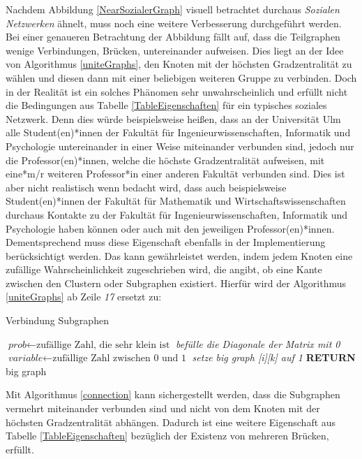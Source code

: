 \newpage
Nachdem Abbildung \ref{NearSozialerGraph} visuell betrachtet durchaus \textit{Sozialen Netzwerken} ähnelt, muss noch eine weitere Verbesserung durchgeführt werden. Bei einer genaueren Betrachtung der Abbildung fällt auf, dass die Teilgraphen wenige Verbindungen, Brücken, untereinander aufweisen. Dies liegt an der Idee von Algorithmus \ref{uniteGraphs}, den Knoten mit der höchsten Gradzentralität zu wählen und diesen dann mit einer beliebigen weiteren Gruppe zu verbinden. Doch in der Realität ist ein solches Phänomen sehr unwahrscheinlich und erfüllt nicht die Bedingungen aus Tabelle \ref{TableEigenschaften} für ein typisches soziales Netzwerk. Denn dies würde beispielsweise heißen, dass an der Universität Ulm alle Student(en)*innen der Fakultät für Ingenieurwissenschaften, Informatik und Psychologie untereinander in einer Weise miteinander verbunden sind, jedoch nur die Professor(en)*innen, welche die höchste Gradzentralität aufweisen, mit eine*m/r weiteren Professor*in einer anderen Fakultät verbunden sind. Dies ist aber nicht realistisch wenn bedacht wird, dass auch beispielsweise Student(en)*innen der Fakultät für Mathematik und Wirtschaftswissenschaften durchaus Kontakte zu der Fakultät für Ingenieurwissenschaften, Informatik und Psychologie haben können oder auch mit den jeweiligen Professor(en)*innen. Dementsprechend muss diese Eigenschaft ebenfalls in der Implementierung berücksichtigt werden. Das kann gewährleistet werden, indem jedem Knoten eine zufällige Wahrscheinlichkeit zugeschrieben wird, die angibt, ob eine Kante zwischen den Clustern oder Subgraphen existiert. Hierfür wird der Algorithmus \ref{uniteGraphs} ab Zeile \textit{17} ersetzt zu:

\begin{algorithm}
\caption{Verbindung Subgraphen}\label{connection}
\begin{algorithmic}[1]
\State $\textit{prob} \gets \text{zufällige Zahl, die sehr klein ist}$
\State \textit{befülle die Diagonale der Matrix mit 0}
\EndFor
{}
\State $\textit{variable} \gets \text{zufällige Zahl zwischen 0 und 1}$
\State \textit{setze big graph [i][k] auf 1}
\EndIf
\EndFor
\EndFor
\textbf{RETURN} big graph
\EndProcedure
\end{algorithmic}
\end{algorithm}

Mit Algorithmus \ref{connection} kann sichergestellt werden, dass die Subgraphen vermehrt miteinander verbunden sind und nicht von dem Knoten mit der höchsten Gradzentralität abhängen. Dadurch ist eine weitere Eigenschaft aus Tabelle \ref{TableEigenschaften} bezüglich der Existenz von mehreren Brücken, erfüllt.

